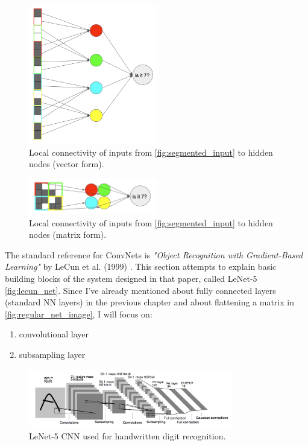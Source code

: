 \documentclass[11pt]{article}
\begin{document}
\begin{figure}[h]
\includegraphics[width=0.5\textwidth]{cnn_column}
\centering
\caption{Local connectivity of inputs from \autoref{fig:segmented_input} to hidden nodes (vector form).}
\label{fig:cnn_column}
\end{figure}

\begin{figure}[h]
\includegraphics[width=0.5\textwidth]{cnn_spacial}
\centering
\caption{Local connectivity of inputs from \autoref{fig:segmented_input} to hidden nodes (matrix form).}
\label{fig:cnn_spacial}
\end{figure}

The standard reference for ConvNets is \textit{"Object Recognition with Gradient-Based Learning"} by LeCun et al. (1999) \cite{lecun_object}. This section attempts to explain basic building blocks of the system designed in that paper, called LeNet-5 \autoref{fig:lecun_net}. Since I've already mentioned about fully connected layers (standard NN layers) in the previous chapter and about flattening a matrix in \autoref{fig:regular_net_image}, I will focus on:
\begin{enumerate}[1)]
\item convolutional layer
\item subsampling layer
\end{enumerate}

\begin{figure}[h]
\includegraphics[width=0.8\textwidth]{lecun_net}
\centering
\caption{LeNet-5 CNN \cite{lecun_object} used for handwritten digit recognition.}
\label{fig:lecun_net}
\end{figure}
\end{document}
